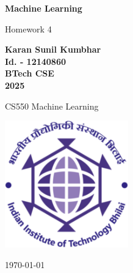 \documentclass[10pt, a4paper]{article}
\newcommand\course{CS550 Machine Learning}                            %
\newcommand\hwnumber{ 4}                                 %
\newcommand\Information{Karan Sunil Kumbhar }                        %
\newcommand\Informatio{Id. - 12140860}
\newcommand\Informati{BTech CSE}
\newcommand\Informat{2025}
\begin{document}
\begin{titlepage}
    \begin{center}
        \vspace*{3cm}

        \Huge
        \textbf{Machine Learning}

        \vspace{1cm}
        \huge
        Homework\hwnumber

        \vspace{1.5cm}
        \Large

        \textbf{\Information}\\                      %
        \textbf{\Informatio}\\
        \textbf{\Informati} \\
        \textbf{\Informat} \\

        \vfill

        \course \

        \vspace{1cm}

        \includegraphics[width=0.4\textwidth]{iitbh.png}
        \\

        \Large

        \today

    \end{center}
\end{titlepage}


% 
\newpage
\subsubsection*{}
\end{document}
